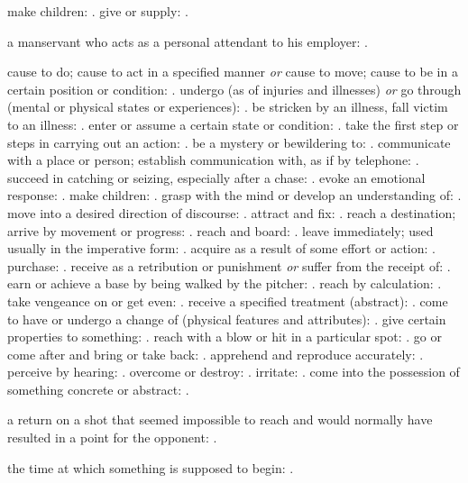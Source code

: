   make children: . give or supply: .

  a manservant who acts as a personal attendant to his employer: .

  cause to do; cause to act in a specified manner \textit{or} cause to move; cause to be in a certain position or condition: . undergo (as of injuries and illnesses) \textit{or} go through (mental or physical states or experiences): . be stricken by an illness, fall victim to an illness: . enter or assume a certain state or condition: . take the first step or steps in carrying out an action: . be a mystery or bewildering to: . communicate with a place or person; establish communication with, as if by telephone: . succeed in catching or seizing, especially after a chase: . evoke an emotional response: . make children: . grasp with the mind or develop an understanding of: . move into a desired direction of discourse: . attract and fix: . reach a destination; arrive by movement or progress: . reach and board: . leave immediately; used usually in the imperative form: . acquire as a result of some effort or action: . purchase: . receive as a retribution or punishment \textit{or} suffer from the receipt of: . earn or achieve a base by being walked by the pitcher: . reach by calculation: . take vengeance on or get even: . receive a specified treatment (abstract): . come to have or undergo a change of (physical features and attributes): . give certain properties to something: . reach with a blow or hit in a particular spot: . go or come after and bring or take back: . apprehend and reproduce accurately: . perceive by hearing: . overcome or destroy: . irritate: . come into the possession of something concrete or abstract: .

  a return on a shot that seemed impossible to reach and would normally have resulted in a point for the opponent: .

  the time at which something is supposed to begin: .

